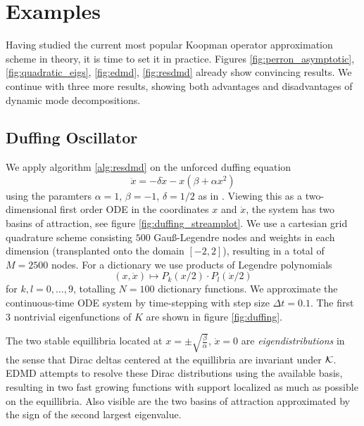 
\section{Examples}\label{sec:benchmark}

Having studied the current most popular Koopman operator approximation scheme in theory, 
it is time to set it in practice. Figures \ref{fig:perron_asymptotic}, 
\ref{fig:quadratic_eigs}, \ref{fig:edmd}, \ref{fig:resdmd} already show convincing 
results. We continue with three more results, showing both advantages and disadvantages 
of dynamic mode decompositions. 

\subsection{Duffing Oscillator}\label{sec:duffing}

We apply algorithm \ref{alg:resdmd} on the unforced duffing equation \cite{duffing}
\begin{equation}
    \label{eq:duffing}
    \ddot{x} = - \delta \dot{x} - x (\beta + \alpha x^2)
\end{equation}
using the paramters $\alpha = 1$, $\beta = -1$, $\delta = 1/2$ as in \cite{edmd}. Viewing 
this as a two-dimensional first order ODE in the coordinates $x$ and $\dot{x}$, the system 
has two basins of attraction, see figure \ref{fig:duffing_streamplot}. We use a cartesian 
grid quadrature scheme consisting $500$ Gauß-Legendre nodes and weights in each 
dimension (transplanted onto the domain $[-2,2]$), resulting in a total of $M = 2500$ 
nodes. For a dictionary we use products of Legendre polynomials
\begin{equation}
    (x, \dot{x}) \mapsto P_k (x/2) \cdot P_l (\dot{x}/2)
\end{equation}
for $k, l = 0, \ldots, 9$, totalling $N = 100$ dictionary functions. We approximate the 
continuous-time ODE system by time-stepping with step size $\Delta t = 0.1$. The first 
$3$ nontrivial eigenfunctions of $K$ are shown in figure \ref{fig:duffing}. 

The 
two stable equillibria located at $x = \pm \sqrt{\frac{\beta}{\alpha}}$, $\dot{x} = 0$ are 
\emph{eigendistributions} in the sense that Dirac deltas centered at the equillibria 
are invariant under $\mathcal{K}$. EDMD attempts to resolve these Dirac distributions using the 
available basis, resulting in two fast growing functions with support localized as much as 
possible on the equillibria. Also visible are the two basins of attraction approximated by 
the sign of the second largest eigenvalue. 


